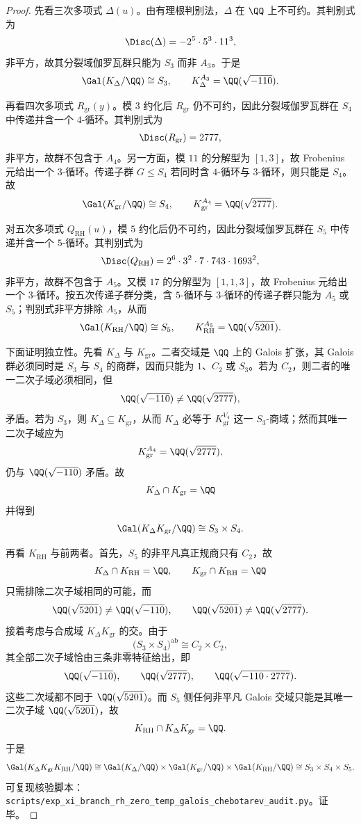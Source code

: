 \begin{proof}
先看三次多项式 \(\Delta(u)\)。由有理根判别法，\(\Delta\) 在 \(\QQ\) 上不可约。其判别式为
\[
\Disc(\Delta)=-2^5\cdot 5^3\cdot 11^3,
\]
非平方，故其分裂域伽罗瓦群只能为 \(S_3\) 而非 \(A_3\)。于是
\[
\Gal(K_\Delta/\QQ)\cong S_3,
\qquad
K_\Delta^{A_3}=\QQ(\sqrt{-110}).
\]
\par
再看四次多项式 \(R_{\mathrm{gr}}(y)\)。模 \(3\) 约化后 \(R_{\mathrm{gr}}\) 仍不可约，因此分裂域伽罗瓦群在 \(S_4\) 中传递并含一个 \(4\)-循环。其判别式为
\[
\Disc(R_{\mathrm{gr}})=2777,
\]
非平方，故群不包含于 \(A_4\)。另一方面，模 \(11\) 的分解型为 \([1,3]\)，故 Frobenius 元给出一个 \(3\)-循环。传递子群 \(G\le S_4\) 若同时含 \(4\)-循环与 \(3\)-循环，则只能是 \(S_4\)。故
\[
\Gal(K_{\mathrm{gr}}/\QQ)\cong S_4,
\qquad
K_{\mathrm{gr}}^{A_4}=\QQ(\sqrt{2777}).
\]
\par
对五次多项式 \(Q_{\mathrm{RH}}(u)\)，模 \(5\) 约化后仍不可约，因此分裂域伽罗瓦群在 \(S_5\) 中传递并含一个 \(5\)-循环。其判别式为
\[
\Disc(Q_{\mathrm{RH}})
=
2^6\cdot 3^2\cdot 7\cdot 743\cdot 1693^2,
\]
非平方，故群不包含于 \(A_5\)。又模 \(17\) 的分解型为 \([1,1,3]\)，故 Frobenius 元给出一个 \(3\)-循环。按五次传递子群分类，含 \(5\)-循环与 \(3\)-循环的传递子群只能为 \(A_5\) 或 \(S_5\)；判别式非平方排除 \(A_5\)，从而
\[
\Gal(K_{\mathrm{RH}}/\QQ)\cong S_5,
\qquad
K_{\mathrm{RH}}^{A_5}=\QQ(\sqrt{5201}).
\]
\par
下面证明独立性。先看 \(K_\Delta\) 与 \(K_{\mathrm{gr}}\)。二者交域是 \(\QQ\) 上的 Galois 扩张，其 Galois 群必须同时是 \(S_3\) 与 \(S_4\) 的商群，因而只能为 \(1\)、\(C_2\) 或 \(S_3\)。若为 \(C_2\)，则二者的唯一二次子域必须相同，但
\[
\QQ(\sqrt{-110})\neq \QQ(\sqrt{2777}),
\]
矛盾。若为 \(S_3\)，则 \(K_\Delta\subseteq K_{\mathrm{gr}}\)，从而 \(K_\Delta\) 必等于 \(K_{\mathrm{gr}}^{V_4}\) 这一 \(S_3\)-商域；然而其唯一二次子域应为
\[
K_{\mathrm{gr}}^{A_4}=\QQ(\sqrt{2777}),
\]
仍与 \(\QQ(\sqrt{-110})\) 矛盾。故
\[
K_\Delta\cap K_{\mathrm{gr}}=\QQ
\]
并得到
\[
\Gal(K_\Delta K_{\mathrm{gr}}/\QQ)\cong S_3\times S_4.
\]
\par
再看 \(K_{\mathrm{RH}}\) 与前两者。首先，\(S_5\) 的非平凡真正规商只有 \(C_2\)，故
\[
K_\Delta\cap K_{\mathrm{RH}}=\QQ,
\qquad
K_{\mathrm{gr}}\cap K_{\mathrm{RH}}=\QQ
\]
只需排除二次子域相同的可能，而
\[
\QQ(\sqrt{5201})
\neq
\QQ(\sqrt{-110}),
\qquad
\QQ(\sqrt{5201})
\neq
\QQ(\sqrt{2777}).
\]
接着考虑与合成域 \(K_\Delta K_{\mathrm{gr}}\) 的交。由于
\[
\bigl(S_3\times S_4\bigr)^{\mathrm{ab}}\cong C_2\times C_2,
\]
其全部二次子域恰由三条非零特征给出，即
\[
\QQ(\sqrt{-110}),\qquad
\QQ(\sqrt{2777}),\qquad
\QQ(\sqrt{-110\cdot 2777}).
\]
这些二次域都不同于 \(\QQ(\sqrt{5201})\)。而 \(S_5\) 侧任何非平凡 Galois 交域只能是其唯一二次子域 \(\QQ(\sqrt{5201})\)，故
\[
K_{\mathrm{RH}}\cap K_\Delta K_{\mathrm{gr}}=\QQ.
\]
于是
\[
\Gal(K_\Delta K_{\mathrm{gr}}K_{\mathrm{RH}}/\QQ)
\cong
\Gal(K_\Delta/\QQ)\times\Gal(K_{\mathrm{gr}}/\QQ)\times\Gal(K_{\mathrm{RH}}/\QQ)
\cong
S_3\times S_4\times S_5.
\]
可复现核验脚本：\texttt{scripts/exp\_xi\_branch\_rh\_zero\_temp\_galois\_chebotarev\_audit.py}。证毕。
\end{proof}

